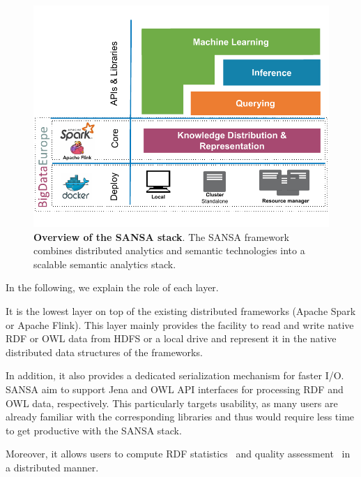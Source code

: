 \begin{figure}
\centering 
	\includegraphics[width=0.95\columnwidth]{images/7_implemenation_and_usecases/sansa-architecture.pdf}
	\caption{\textbf{Overview of the SANSA stack}.
	The SANSA framework combines distributed analytics and semantic technologies into a scalable semantic analytics stack.}
	\label{fig:imp-use-cases-sansa-architecture}
\end{figure}

In the following, we explain the role of each layer.

It is the lowest layer on top of the existing distributed frameworks (Apache Spark or Apache Flink).
This layer mainly provides the facility to read and write native \gls{RDF} or \gls{OWL} data from \gls{HDFS} or a local drive and represent it in the native distributed data structures of the frameworks.

In addition, it also provides a dedicated serialization mechanism for faster I/O. 
SANSA aim to support Jena and \gls{OWL} \gls{API} interfaces for processing \gls{RDF} and \gls{OWL} data, respectively.
This particularly targets usability, as many users are already familiar with the corresponding libraries and thus would require less time to get productive with the SANSA stack.

Moreover, it allows users to compute \gls{RDF} statistics~\cite{sejdiu-2018-dist-lod-stats-iswc} and quality assessment~\cite{sejdiu-2019-sansa-dist-quality-assessment-iswc} in a distributed manner.


